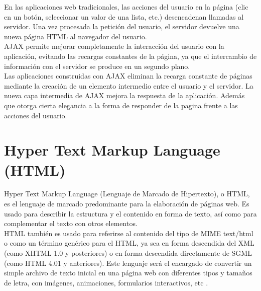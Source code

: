 En las aplicaciones web tradicionales, las acciones del usuario en la p\'agina (clic en un bot\'on, seleccionar un valor de una lista, etc.) desencadenan llamadas al servidor. Una vez procesada la petici\'on del usuario, el servidor devuelve una nueva p\'agina HTML al navegador del usuario.\\
AJAX permite mejorar completamente la interacci\'on del usuario con la aplicaci\'on, evitando las recargas constantes de la p\'agina, ya que el intercambio de informaci\'on con el servidor se produce en un segundo plano.\\
Las aplicaciones construidas con AJAX eliminan la recarga constante de p\'aginas mediante la creaci\'on de un elemento intermedio entre el usuario y el servidor. La nueva capa intermedia de AJAX mejora la respuesta de la aplicaci\'on. Adem\'as que otorga cierta elegancia a la forma de responder de la pagina frente a las acciones del usuario.






\section{Hyper Text Markup Language (HTML)}
Hyper Text Markup Language (Lenguaje de Marcado de Hipertexto), o HTML, es el lenguaje de marcado predominante para la elaboraci\'on de p\'aginas web. Es usado para describir la estructura y el contenido en forma de texto, as\'i como para complementar el texto con otros elementos.\\
HTML tambi\'en es usado para referirse al contenido del tipo de MIME text/html o como un t\'ermino gen\'erico para el HTML, ya sea en forma descendida del XML (como XHTML 1.0 y posteriores) o en forma descendida directamente de SGML (como HTML 4.01 y anteriores).
Este lenguaje ser\'a el encargado de convertir un simple archivo de texto inicial en una p\'agina web con diferentes tipos y tama\~nos de letra, con im\'agenes, animaciones, formularios interactivos, etc \cite{html}.

